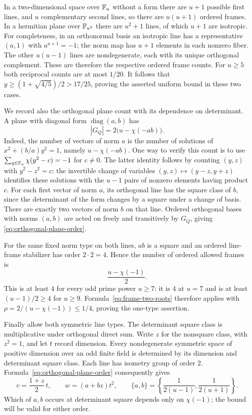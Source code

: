 In a two-dimensional space over $\mathbb F_u$ without a form there are
$u+1$ possible first lines, and $u$ complementary second lines, so
there are $u(u+1)$ ordered frames.  In a hermitian plane over
$\mathbb F_{u^2}$ there are $u^2+1$ lines, of which $u+1$ are isotropic.
For completeness, in an orthonormal basis an isotropic line has a
representative $(a,1)$ with $a^{u+1}=-1$; the norm map has $u+1$
elements in each nonzero fiber.  The other $u(u-1)$ lines are
nondegenerate, each with its unique orthogonal complement.  These
are therefore the respective ordered frame counts.  For $u\geq5$
both reciprocal counts are at most $1/20$.  It follows that
$y\geq(1+\sqrt{4/5})/2>17/25$, proving the asserted uniform bound
in these two cases.

We record also the orthogonal plane count with its dependence on
determinant.  A plane with diagonal form $\operatorname{diag}(a,b)$
has
\begin{equation}\label{eq:orthogonal-plane-order}
 |G_Q|=2\bigl(u-\chi(-ab)\bigr).
\end{equation}
Indeed, the number of vectors of norm $a$ is the number of solutions
of $x^2+(b/a)y^2=1$, namely $u-\chi(-ab)$.  One way to verify this
count is to use
$\sum_{y\in\mathbb F_u}\chi(y^2-c)=-1$ for $c\ne0$.
The latter identity follows by counting $(y,z)$ with
$y^2-z^2=c$: the invertible change of variables
$(y,z)\mapsto(y-z,y+z)$ identifies these solutions with the $u-1$
pairs of nonzero elements having product $c$.
For each first vector of norm $a$, its orthogonal line has the square
class of $b$, since the determinant of the form changes by a square
under a change of basis.  There are exactly two vectors of norm $b$
on that line.  Ordered orthogonal bases with norms $(a,b)$ are acted
on freely and transitively by $G_Q$, giving
\eqref{eq:orthogonal-plane-order}.

For the same fixed norm type on both lines, $ab$ is a square and an
ordered line-frame stabilizer has order $2\cdot2=4$.  Hence the number
of ordered allowed frames is
\[
 \frac{u-\chi(-1)}2.
\]
This is at least $4$ for every odd prime power $u\geq7$: it is $4$
at $u=7$ and is at least $(u-1)/2\geq4$ for $u\geq9$.
Formula~\eqref{eq:frame-two-roots} therefore applies with
$\rho=2/(u-\chi(-1))\leq1/4$, proving the one-type assertion.

Finally allow both symmetric line types.  The determinant square
class is multiplicative under orthogonal direct sum.  Write $z$ for
the nonsquare class, with $z^2=1$, and let $t$ record dimension.
Every nondegenerate symmetric space of positive dimension over an
odd finite field is determined by its dimension and determinant
square class.  Each line has isometry group of order $2$.
Formula~\eqref{eq:orthogonal-plane-order} consequently gives
\begin{equation}\label{eq:frame-discriminant-series}
 v=\frac{1+z}{2}\,t,\qquad
 w=(a+bz)t^2,\qquad
 \{a,b\}=\left\{\frac1{2(u-1)},\frac1{2(u+1)}\right\}.
\end{equation}
Which of $a,b$ occurs at determinant square depends only on
$\chi(-1)$; the bound will be valid for either order.

